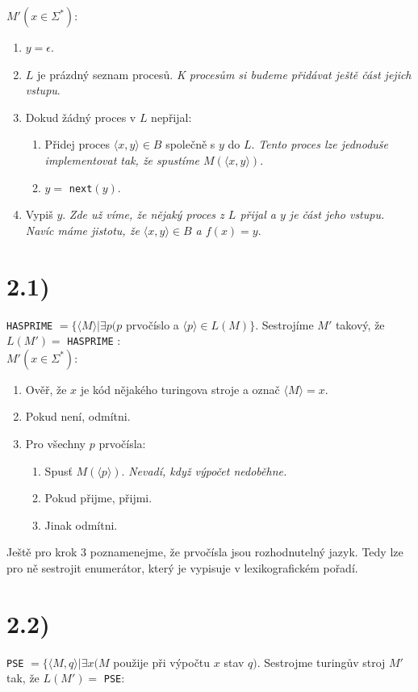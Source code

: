 \documentclass{article}
\begin{document}
$M'(x \in \Sigma^*)$:
\begin{enumerate}
  \item $y = \epsilon$.
  \item $L$ je prázdný seznam procesů. \emph{K procesům si budeme přidávat
  ještě část jejich vstupu}.
  \item Dokud žádný proces v $L$ nepřijal:
  \begin{enumerate}
    \item Přidej proces $\langle x,y \rangle \in B$ společně s $y$ do $L$.
    \emph{Tento proces lze jednoduše implementovat tak, že spustíme
    $M(\langle x,y \rangle )$}.
    \item $y =$ \texttt{next}$(y)$.
  \end{enumerate}
  \item Vypiš $y$. \emph{Zde už víme, že nějaký proces z $L$ přijal a $y$ je
  část jeho vstupu. Navíc máme jistotu, že $\langle x,y \rangle \in B$ a $f(x) = y$}.
\end{enumerate}


\section*{2.1)}
\texttt{HASPRIME} $= \{\langle M \rangle |
\exists p(p$ prvočíslo a $\langle p \rangle \in L(M)\}$.
Sestrojíme $M'$ takový, že $L(M') =$ \texttt{HASPRIME} :\\

$M'(x \in \Sigma^*)$:
\begin{enumerate}
  \item Ověř, že $x$ je kód nějakého turingova stroje a označ
  $\langle M \rangle = x$.
  \item Pokud není, odmítni.
  \item Pro všechny $p$ prvočísla:
  \begin{enumerate}
    \item Spusť $M(\langle p \rangle)$. \emph{Nevadí, když výpočet nedoběhne.}
    \item Pokud přijme, přijmi.
    \item Jinak odmítni.
  \end{enumerate}
\end{enumerate}

Ještě pro krok 3 poznamenejme, že prvočísla jsou rozhodnutelný jazyk.
Tedy lze pro ně sestrojit enumerátor, který je vypisuje v lexikografickém pořadí.

\section*{2.2)}
\texttt{PSE} $= \{\langle M,q \rangle | \exists x ( M$ použije při výpočtu $x$ stav $q)$.
Sestrojme turingův stroj $M'$ tak, že $L(M') = $ \texttt{PSE}: \\
\end{document}
